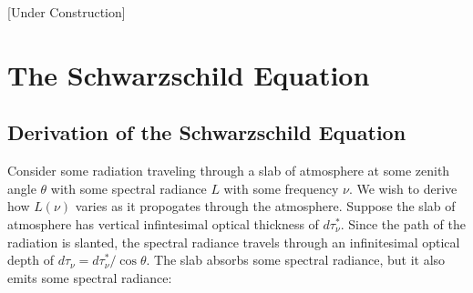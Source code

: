 [Under Construction]

\chapter{The Schwarzschild Equation}\label{Schwarzschild Section}

\section{Derivation of the Schwarzschild Equation}

Consider some radiation traveling through a slab of atmosphere at some zenith angle $\theta$ with some spectral radiance $L$ with some frequency $\nu$. We wish to derive how $L(\nu)$ varies as it propogates through the atmosphere. Suppose the slab of atmosphere has vertical infintesimal optical thickness of $d\tau_\nu^*$. Since the path of the radiation is slanted, the spectral radiance travels through an infinitesimal optical depth of $d\tau_\nu=d\tau_\nu^*/\cos\theta$. The slab absorbs some spectral radiance, but it also emits some spectral radiance:

\begin{figure}[H]
    \centering
\end{figure}

